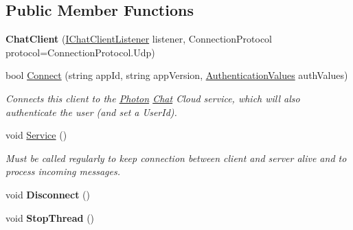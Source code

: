 \subsection*{Public Member Functions}
\begin{DoxyCompactItemize}
\item 
{\bfseries Chat\+Client} (\hyperlink{interface_exit_games_1_1_client_1_1_photon_1_1_chat_1_1_i_chat_client_listener}{I\+Chat\+Client\+Listener} listener, Connection\+Protocol protocol=Connection\+Protocol.\+Udp)\hypertarget{class_exit_games_1_1_client_1_1_photon_1_1_chat_1_1_chat_client_a5088b919addd1ae88cf8ed72d68c52c2}{}\label{class_exit_games_1_1_client_1_1_photon_1_1_chat_1_1_chat_client_a5088b919addd1ae88cf8ed72d68c52c2}

\item 
bool \hyperlink{class_exit_games_1_1_client_1_1_photon_1_1_chat_1_1_chat_client_a4fb7f78c7820b02fb0ec3c173ff0d2d5}{Connect} (string app\+Id, string app\+Version, \hyperlink{class_exit_games_1_1_client_1_1_photon_1_1_chat_1_1_authentication_values}{Authentication\+Values} auth\+Values)
\begin{DoxyCompactList}\small\item\em Connects this client to the \hyperlink{namespace_exit_games_1_1_client_1_1_photon}{Photon} \hyperlink{namespace_exit_games_1_1_client_1_1_photon_1_1_chat}{Chat} Cloud service, which will also authenticate the user (and set a User\+Id). \end{DoxyCompactList}\item 
void \hyperlink{class_exit_games_1_1_client_1_1_photon_1_1_chat_1_1_chat_client_a4e5b2c3dc8f4e43b053bd3436dd39c5f}{Service} ()
\begin{DoxyCompactList}\small\item\em Must be called regularly to keep connection between client and server alive and to process incoming messages. \end{DoxyCompactList}\item 
void {\bfseries Disconnect} ()\hypertarget{class_exit_games_1_1_client_1_1_photon_1_1_chat_1_1_chat_client_a21acfc202dc0114eabdba678e03f21f1}{}\label{class_exit_games_1_1_client_1_1_photon_1_1_chat_1_1_chat_client_a21acfc202dc0114eabdba678e03f21f1}

\item 
void {\bfseries Stop\+Thread} ()\hypertarget{class_exit_games_1_1_client_1_1_photon_1_1_chat_1_1_chat_client_af9ac75f889489a06dbc8f6d7881367c4}{}\label{class_exit_games_1_1_client_1_1_photon_1_1_chat_1_1_chat_client_af9ac75f889489a06dbc8f6d7881367c4}


\end{DoxyCompactItemize}
